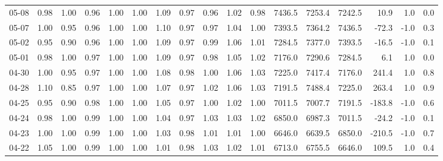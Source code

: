 \begin{threeparttable}
{\begin{tabular}{lrrrrrrrrrrrrrrrr}
  05-08 &   0.98 &   1.00 &         0.96 &     1.00 &           1.00 &        1.09 &        0.97 &        0.96 &          1.02 &          0.98 & 7436.5 & 7253.4 & 7242.5 &       10.9 &                      1.0 &                 0.0 \\
  05-07 &   1.00 &   0.95 &         0.96 &     1.00 &           1.00 &        1.10 &        0.97 &        0.97 &          1.04 &          1.00 & 7393.5 & 7364.2 & 7436.5 &      -72.3 &                     -1.0 &                 0.3 \\
  05-02 &   0.95 &   0.90 &         0.96 &     1.00 &           1.00 &        1.09 &        0.97 &        0.99 &          1.06 &          1.01 & 7284.5 & 7377.0 & 7393.5 &      -16.5 &                     -1.0 &                 0.1 \\
  05-01 &   0.98 &   1.00 &         0.97 &     1.00 &           1.00 &        1.09 &        0.97 &        0.98 &          1.05 &          1.02 & 7176.0 & 7290.6 & 7284.5 &        6.1 &                      1.0 &                 0.0 \\
  04-30 &   1.00 &   0.95 &         0.97 &     1.00 &           1.00 &        1.08 &        0.98 &        1.00 &          1.06 &          1.03 & 7225.0 & 7417.4 & 7176.0 &      241.4 &                      1.0 &                 0.8 \\
  04-28 &   1.10 &   0.85 &         0.97 &     1.00 &           1.00 &        1.07 &        0.97 &        1.02 &          1.06 &          1.03 & 7191.5 & 7488.4 & 7225.0 &      263.4 &                      1.0 &                 0.9 \\
  04-25 &   0.95 &   0.90 &         0.98 &     1.00 &           1.00 &        1.05 &        0.97 &        1.00 &          1.02 &          1.00 & 7011.5 & 7007.7 & 7191.5 &     -183.8 &                     -1.0 &                 0.6 \\
  04-24 &   0.98 &   1.00 &         0.99 &     1.00 &           1.00 &        1.04 &        0.97 &        1.03 &          1.03 &          1.02 & 6850.0 & 6987.3 & 7011.5 &      -24.2 &                     -1.0 &                 0.1 \\
  04-23 &   1.00 &   1.00 &         0.99 &     1.00 &           1.00 &        1.03 &        0.98 &        1.01 &          1.01 &          1.00 & 6646.0 & 6639.5 & 6850.0 &     -210.5 &                     -1.0 &                 0.7 \\
  04-22 &   1.05 &   1.00 &         0.99 &     1.00 &           1.00 &        1.01 &        0.98 &        1.03 &          1.02 &          1.01 & 6713.0 & 6755.5 & 6646.0 &      109.5 &                      1.0 &                 0.4 \\

\end{tabular}}
\end{threeparttable}
